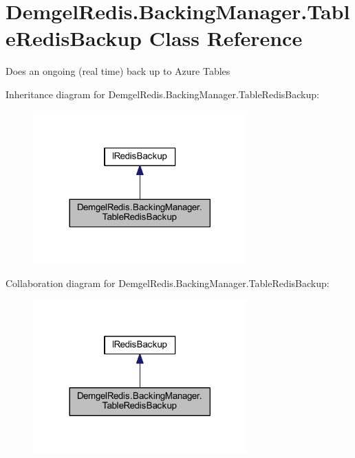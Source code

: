 \hypertarget{class_demgel_redis_1_1_backing_manager_1_1_table_redis_backup}{}\section{Demgel\+Redis.\+Backing\+Manager.\+Table\+Redis\+Backup Class Reference}
\label{class_demgel_redis_1_1_backing_manager_1_1_table_redis_backup}


Does an ongoing (real time) back up to Azure Tables  




Inheritance diagram for Demgel\+Redis.\+Backing\+Manager.\+Table\+Redis\+Backup\+:
\nopagebreak
\begin{figure}[H]
\begin{center}
\leavevmode
\includegraphics[width=233pt]{class_demgel_redis_1_1_backing_manager_1_1_table_redis_backup__inherit__graph}
\end{center}
\end{figure}


Collaboration diagram for Demgel\+Redis.\+Backing\+Manager.\+Table\+Redis\+Backup\+:
\nopagebreak
\begin{figure}[H]
\begin{center}
\leavevmode
\includegraphics[width=233pt]{class_demgel_redis_1_1_backing_manager_1_1_table_redis_backup__coll__graph}
\end{center}
\end{figure}
